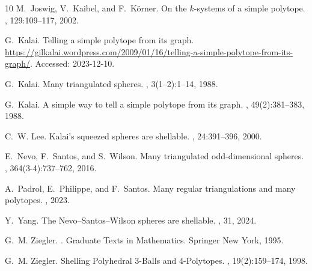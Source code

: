 \documentclass[11pt,twoside]{article}
\theoremstyle{definition}
\begin{document}
\begin{thebibliography}{10}
M.~Joswig, V.~Kaibel, and F.~K\"orner.
\newblock On the $k$-systems of a simple polytope.
, 129:109--117, 2002.

G.~Kalai.
\newblock Telling a simple polytope from its graph.
\newblock \url{https://gilkalai.wordpress.com/2009/01/16/telling-a-simple-polytope-from-its-graph/}.
\newblock Accessed: 2023-12-10.

G.~Kalai.
\newblock Many triangulated spheres.
, 3(1--2):1--14, 1988.

G.~Kalai.
\newblock A simple way to tell a simple polytope from its graph.
, 49(2):381--383, 1988.

C.~W. Lee.
\newblock Kalai's squeezed spheres are shellable.
, 24:391--396, 2000.

E.~Nevo, F.~Santos, and S.~Wilson.
\newblock Many triangulated odd-dimensional spheres.
, 364(3-4):737--762, 2016.

A.~Padrol, E.~Philippe, and F.~Santos.
\newblock Many regular triangulations and many polytopes.
, 2023.

Y.~Yang.
\newblock The {Nevo}--{Santos}--{Wilson} spheres are shellable.
, 31, 2024.

G.~M. Ziegler.
.
\newblock Graduate Texts in Mathematics. Springer New York, 1995.

G.~M. Ziegler.
\newblock Shelling {P}olyhedral 3-{B}alls and 4-{P}olytopes.
, 19(2):159--174, 1998.

\end{thebibliography}
\end{document}

